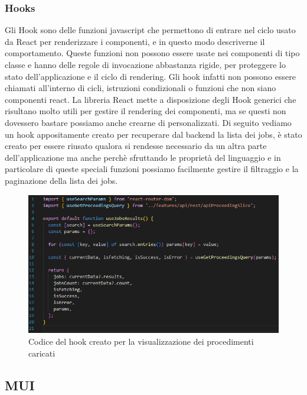 \subsubsection{Hooks}
Gli Hook sono delle funzioni javascript che permettono di entrare nel ciclo usato da React per renderizzare i componenti, e in questo modo descriverne il comportamento.
Queste funzioni non possono essere usate nei componenti di tipo classe e hanno delle regole di invocazione abbastanza rigide, per proteggere lo stato dell'applicazione e il
ciclo di rendering. Gli hook infatti non possono essere chiamati all'interno di cicli, istruzioni condizionali o funzioni che non siano componenti react. La libreria React mette
a disposizione degli Hook generici che risultano molto utili per gestire il rendering dei componenti, ma se questi non dovessero bastare possiamo anche crearne di personalizzati.
Di seguito vediamo un hook appositamente creato per recuperare dal backend la lista dei jobs, è stato creato per essere riusato qualora si rendesse necessario da un altra parte
dell'applicazione ma anche perchè sfruttando le proprietà del linguaggio e in particolare di queste speciali funzioni possiamo facilmente gestire il filtraggio e la
paginazione della lista dei jobs.

\begin{figure}[H]
  \centering
  \includegraphics[width=\textwidth]{immagini/useJobResult-hook.png}
  \caption{Codice del hook creato per la visualizzazione dei procedimenti caricati}
\end{figure}

\subsection{MUI}
